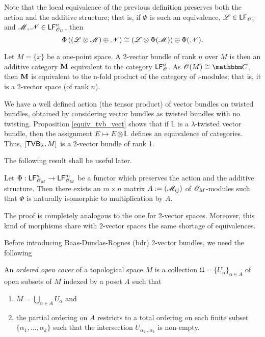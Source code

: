 \begin{obs}
Note that the local equivalence of the previous definition preserves both the action and the additive structure; that is, if $\Phi$ is such an equivalence, $\mathscr{L}\in \mathsf{LF}_{\mathscr{O}_U}$ and $\mathscr{M},\mathscr{N} \in \mathsf{LF}^n_{\mathscr{O}_U}$, then
$$\Phi \left ((\mathscr{L}\otimes \mathscr{M})\oplus \mathscr{N}\right )\cong \left (\mathscr{L}\otimes \Phi (\mathscr{M})\right )\oplus \Phi (\mathscr{N}).$$
\end{obs}

\begin{ej}
Let $M=\{x\}$ be a one-point space. A 2-vector bundle of rank $n$ over $M$ is then an additive category ${\bf M}$ equivalent to the category $\mathsf{LF}^n_{\mathscr{O}}$. As $\scr{O}(M)\cong \comp$, then ${\bf M}$ is equivalent to the n-fold product of the category of $\comp$-modules; that is, it is a 2-vector space (of rank $n$). 
\end{ej}

\begin{ej}
We have a well defined action (the tensor product) of vector bundles on twisted bundles, obtained by considering vector bundles as twisted bundles with no twisting. Proposition \ref{equiv_tvb_vect} shows that if $\mathbb{L}$ is a $\lambda$-twisted vector bundle, then the assignment $E\mapsto E\otimes \mathbb{L}$ defines an equivalence of categories. Thus, $[\mathsf{TVB}_{\lambda},M]$ is a 2-vector bundle of rank 1.
\end{ej}

The following result shall be useful later.

\begin{proposition}
Let $\Phi :\mathsf{LF}^n_{\mathscr{O}_M}\to \mathsf{LF}^m_{\mathscr{O}_M}$ be a functor which preserves the action and the additive structure. Then there exists an $m\times n$ matrix $A:=(\mathscr{M}_{ij})$ of $\mathscr{O}_M$-modules such that $\Phi$ is naturally isomorphic to multiplication by $A$.
\end{proposition}

The proof is completely analogous to the one for 2-vector spaces. Moreover, this kind of morphisms share with 2-vector spaces the same shortage of equivalences.

Before introducing Baas-Dundas-Rognes ({\sc bdr}) 2-vector bundles, we need the following

\begin{defi}
An \emph{ordered open cover} of a topological space $M$ is a collection $\mathfrak{U}=\{U_\alpha \}_{\alpha \in A}$ of open subsets of $M$ indexed by a poset $A$ such that
\begin{enumerate}
\item $M=\bigcup_{\alpha \in A}U_\alpha$ and
\item the partial ordering on $A$ restricts to a total ordering on each finite subset $\{\alpha_1,\dots ,\alpha_k\}$ such that the intersection $U_{\alpha_1\dots \alpha_k}$ is non-empty.
\end{enumerate}
\end{defi}

